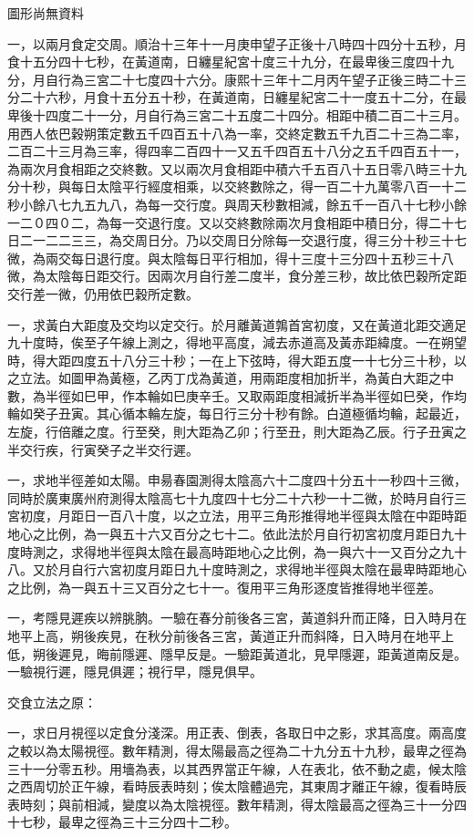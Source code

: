 \begin{pinyinscope}
圖形尚無資料

一，以兩月食定交周。順治十三年十一月庚申望子正後十八時四十四分十五秒，月食十五分四十七秒，在黃道南，日纏星紀宮十度三十九分，在最卑後三度四十九分，月自行為三宮二十七度四十六分。康熙十三年十二月丙午望子正後三時二十三分二十六秒，月食十五分五十秒，在黃道南，日纏星紀宮二十一度五十二分，在最卑後十四度二十一分，月自行為三宮二十五度二十四分。相距中積二百二十三月。用西人依巴穀朔策定數五千四百五十八為一率，交終定數五千九百二十三為二率，二百二十三月為三率，得四率二百四十一又五千四百五十八分之五千四百五十一，為兩次月食相距之交終數。又以兩次月食相距中積六千五百八十五日零八時三十九分十秒，與每日太陰平行經度相乘，以交終數除之，得一百二十九萬零八百一十二秒小餘八七九五九八，為每一交行度。與周天秒數相減，餘五千一百八十七秒小餘一二０四０二，為每一交退行度。又以交終數除兩次月食相距中積日分，得二十七日二一二二三三，為交周日分。乃以交周日分除每一交退行度，得三分十秒三十七微，為兩交每日退行度。與太陰每日平行相加，得十三度十三分四十五秒三十八微，為太陰每日距交行。因兩次月自行差二度半，食分差三秒，故比依巴穀所定距交行差一微，仍用依巴穀所定數。

一，求黃白大距度及交均以定交行。於月離黃道鶉首宮初度，又在黃道北距交適足九十度時，俟至子午線上測之，得地平高度，減去赤道高及黃赤距緯度。一在朔望時，得大距四度五十八分三十秒；一在上下弦時，得大距五度一十七分三十秒，以之立法。如圖甲為黃極，乙丙丁戊為黃道，用兩距度相加折半，為黃白大距之中數，為半徑如巳甲，作本輪如巳庚辛壬。又取兩距度相減折半為半徑如巳癸，作均輪如癸子丑寅。其心循本輪左旋，每日行三分十秒有餘。白道極循均輪，起最近，左旋，行倍離之度。行至癸，則大距為乙卯；行至丑，則大距為乙辰。行子丑寅之半交行疾，行寅癸子之半交行遲。

一，求地半徑差如太陽。申昜春園測得太陰高六十二度四十分五十一秒四十三微，同時於廣東廣州府測得太陰高七十九度四十七分二十六秒一十二微，於時月自行三宮初度，月距日一百八十度，以之立法，用平三角形推得地半徑與太陰在中距時距地心之比例，為一與五十六又百分之七十二。依此法於月自行初宮初度月距日九十度時測之，求得地半徑與太陰在最高時距地心之比例，為一與六十一又百分之九十八。又於月自行六宮初度月距日九十度時測之，求得地半徑與太陰在最卑時距地心之比例，為一與五十三又百分之七十一。復用平三角形逐度皆推得地半徑差。

一，考隱見遲疾以辨朓朒。一驗在春分前後各三宮，黃道斜升而正降，日入時月在地平上高，朔後疾見，在秋分前後各三宮，黃道正升而斜降，日入時月在地平上低，朔後遲見，晦前隱遲、隱早反是。一驗距黃道北，見早隱遲，距黃道南反是。一驗視行遲，隱見俱遲；視行早，隱見俱早。

交食立法之原：

一，求日月視徑以定食分淺深。用正表、倒表，各取日中之影，求其高度。兩高度之較以為太陽視徑。數年精測，得太陽最高之徑為二十九分五十九秒，最卑之徑為三十一分零五秒。用墻為表，以其西界當正午線，人在表北，依不動之處，候太陰之西周切於正午線，看時辰表時刻；俟太陰體過完，其東周才離正午線，復看時辰表時刻；與前相減，變度以為太陰視徑。數年精測，得太陰最高之徑為三十一分四十七秒，最卑之徑為三十三分四十二秒。


\end{pinyinscope}
